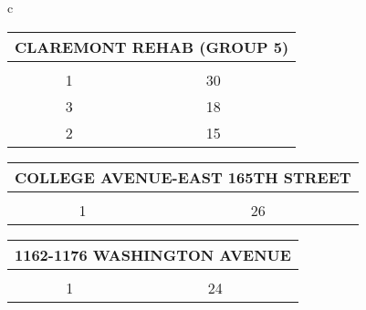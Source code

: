 \begin{table}[H]
\begin{tabular}{c}
                        \begin{tabular}{cc}
                        \multicolumn{2}{l}{CLAREMONT REHAB (GROUP 5)}                                                                                                                                   \\ \hline
                        \rowcolor{\ccorange} 
                        \multicolumn{1}{|c|}{\cellcolor{\ccorange}{\color[HTML]{FFFFFF} Building}} & \multicolumn{1}{c|}{\cellcolor{\ccorange}{\color[HTML]{FFFFFF} Total Repairs}} \\ \hline
                        \multicolumn{1}{|c|}{1}                                                        & \multicolumn{1}{c|}{30}                                                             \\ \hline
\multicolumn{1}{|c|}{3}                                                        & \multicolumn{1}{c|}{18}                                                             \\ \hline
\multicolumn{1}{|c|}{2}                                                        & \multicolumn{1}{c|}{15}                                                             \\ \hline
\end{tabular}
                        \begin{tabular}{cc}
                        \multicolumn{2}{l}{COLLEGE AVENUE-EAST 165TH STREET}                                                                                                                                   \\ \hline
                        \rowcolor{\ccorange} 
                        \multicolumn{1}{|c|}{\cellcolor{\ccorange}{\color[HTML]{FFFFFF} Building}} & \multicolumn{1}{c|}{\cellcolor{\ccorange}{\color[HTML]{FFFFFF} Total Repairs}} \\ \hline
                        \multicolumn{1}{|c|}{1}                                                        & \multicolumn{1}{c|}{26}                                                             \\ \hline
\end{tabular}
                        \begin{tabular}{cc}
                        \multicolumn{2}{l}{1162-1176 WASHINGTON AVENUE}                                                                                                                                   \\ \hline
                        \rowcolor{\ccorange} 
                        \multicolumn{1}{|c|}{\cellcolor{\ccorange}{\color[HTML]{FFFFFF} Building}} & \multicolumn{1}{c|}{\cellcolor{\ccorange}{\color[HTML]{FFFFFF} Total Repairs}} \\ \hline
                        \multicolumn{1}{|c|}{1}                                                        & \multicolumn{1}{c|}{24}                                                             \\ \hline
\end{tabular} \\
                            \end{tabular}
                            \end{table}